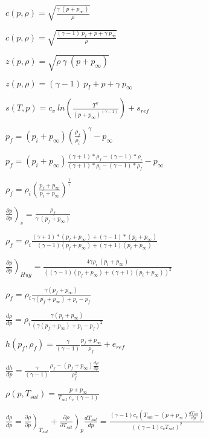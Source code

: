 \documentclass{article}
\begin{document}
$ c(p, \rho) = \sqrt{ \frac{\gamma \ (p+p_{\infty})}{\rho}} $
\pagebreak

$ c(p, \rho) = \sqrt{ \frac{(\gamma-1) \ p_I + p + \gamma \ p_{\infty}}{\rho}} $
\pagebreak

$ z(p, \rho) = \sqrt{ \rho \ \gamma \ (p+p_{\infty}) } $
\pagebreak

$ z(p, \rho) = (\gamma-1) \ p_I + p + \gamma \ p_{\infty} $
\pagebreak

$ s(T, p) = c_v \ ln \left( \frac{T^\gamma} { (p+p_{\infty})^{(\gamma-1)} } \right)+s_{ref} $
\pagebreak

$ p_f = (p_i+p_{\infty}) \left( \frac{\rho_f}{\rho_i} \right) ^\gamma -p_{\infty} $
\pagebreak

$ p_f = (p_i+p_{\infty}) \frac{ (\gamma+1)*\rho_f - (\gamma-1)*\rho_i }{ (\gamma+1)*\rho_i-(\gamma-1)*\rho_f } -p_{\infty} $
\pagebreak

$ \rho_f = \rho_i \left( \frac{p_f+p_{\infty}}{ p_i+p_{\infty}}\right) ^\frac{1}{\gamma} $
\pagebreak

$ \left. \frac{\partial \rho}{\partial p} \right)_s = \frac{\rho_f}{ \gamma \ (p_f+p_{\infty})} $
\pagebreak

$ \rho_f =\rho_i\frac{ (\gamma + 1)*(p_f+p_{\infty}) + (\gamma - 1)*(p_i+p_{\infty})}{(\gamma - 1)(p_f+p_{\infty}) +(\gamma + 1)(p_i+p_{\infty})}$
\pagebreak

$ \left. \frac{\partial \rho}{\partial p} \right)_{Hug} = \frac{4\gamma \rho_i \ (p_i+p_{\infty})}{ \left( (\gamma - 1)(p_f+p_{\infty}) +(\gamma + 1)(p_i+p_{\infty}) \right) ^2} $
\pagebreak

$ \rho_f = \rho_i \frac{\gamma (p_f+p_{\infty})}{\gamma (p_f+p_{\infty}) + p_i - p_f} $
\pagebreak

$ \frac{d\rho}{dp} = \rho_i \frac{\gamma (p_i + p_{\infty})}{\left(\gamma (p_f+p_{\infty}) + p_i - p_f\right)^2} $
\pagebreak

$ h(p_f,{\rho_f})= \frac{\gamma}{(\gamma-1)}\frac{p_f+p_{\infty}}{\rho_f} +e_{ref} $
\pagebreak

$ \frac{dh}{dp}=\frac{\gamma}{(\gamma-1)}\frac{ \rho_f - (p_f+p_{\infty}) \frac{d\rho}{dp} }{\rho_f^2} $
\pagebreak

$ \rho(p, T_{sat}) = \frac{p+p_{\infty}}{T_{sat} \ c_v \ (\gamma-1)}\ $
\pagebreak

$\frac{d \rho}{d p} = \left. \frac{\partial \rho}{\partial p} \right)_{T_{sat}} + \left. \frac{\partial \rho}{\partial T_{sat} } \right)_p \frac{d T_{sat}}{d p} =\frac{(\gamma-1)c_v\left(T_{sat} - (p+p_{\infty})\frac{d T_{sat}}{d p}\right) }{\left((\gamma-1)c_vT_{sat}\right)^2 }$
\pagebreak
\end{document}
